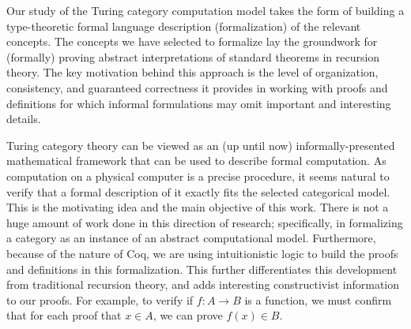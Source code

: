 \documentclass{entcs} \usepackage{entcsmacro}
\begin{document}
Our study of the Turing category computation model takes the form of building a type-theoretic formal language description (formalization) of the relevant concepts. The concepts we have selected to formalize lay the groundwork for (formally) proving abstract interpretations of standard theorems in recursion theory. The key motivation behind  this approach is the level of organization, consistency, and guaranteed correctness it provides in working with proofs and definitions for which informal formulations may omit important and interesting details. 


Turing category theory can be viewed as an (up until now) informally-presented mathematical framework that can be used to describe formal computation. As computation on a physical computer is a precise procedure, it seems natural to verify that a formal description of it exactly fits the selected categorical model. This is the motivating idea and the main objective of this work. There is not a huge amount of work done in this direction of research; specifically, in formalizing a category as an instance of an abstract computational model. Furthermore, because of the nature of Coq, we are using intuitionistic logic to build the proofs and definitions in this formalization.  This further differentiates this development from traditional recursion theory, and adds interesting constructivist information to our proofs. For example, to verify if $f: A\rightarrow B$ is a function, we must confirm that for each proof that $x\in A$, we can prove $f(x)\in B$.

\end{document}
